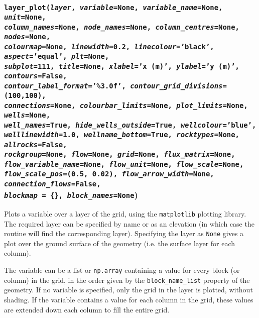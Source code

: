 \begin{snugshade}
\subsubsection{\texttt{layer\_plot(\emph{layer}, \emph{variable}=None, \emph{variable\_name}=None, \emph{unit}=None,\\
    \emph{column\_names}=None, \emph{node\_names}=None, \emph{column\_centres}=None, \emph{nodes}=None,\\
    \emph{colourmap}=None, \emph{linewidth}=0.2, \emph{linecolour}='black', \emph{aspect}='equal', \emph{plt}=None,\\
    \emph{subplot}=111, \emph{title}=None, \emph{xlabel}='x (m)', \emph{ylabel}='y (m)', \emph{contours}=False,\\
    \emph{contour\_label\_format}='\%3.0f', \emph{contour\_grid\_divisions}=(100,100),\\
    \emph{connections}=None, \emph{colourbar\_limits}=None, \emph{plot\_limits}=None, \emph{wells}=None,\\
    \emph{well\_names}=True, \emph{hide\_wells\_outside}=True, \emph{wellcolour}='blue', \\
    \emph{welllinewidth}=1.0, \emph{wellname\_bottom}=True, \emph{rocktypes}=None, \emph{allrocks}=False,\\
    \emph{rockgroup}=None, \emph{flow}=None, \emph{grid}=None, \emph{flux\_matrix}=None,\\
    \emph{flow\_variable\_name}=None, \emph{flow\_unit}=None, \emph{flow\_scale}=None,\\
    \emph{flow\_scale\_pos}=(0.5, 0.02), \emph{flow\_arrow\_width}=None, \emph{connection\_flows}=False,\\
    \emph{blockmap} = \{\}, \emph{block\_names}=None})}\end{snugshade}
\label{sec:mulgrid:layer_plot}

Plots a variable over a layer of the grid, using the \texttt{matplotlib} plotting library.  The required layer can be specified by name or as an elevation (in which case the routine will find the corresponding layer).  Specifying the layer as \texttt{None} gives a plot over the ground surface of the geometry (i.e. the surface layer for each column).

The variable can be a list or \texttt{np.array} containing a value for every block (or column) in the grid, in the order given by the \texttt{block\_name\_list} property of the geometry. If no variable is specified, only the grid in the layer is plotted, without shading.  If the variable contains a value for each column in the grid, these values are extended down each column to fill the entire grid.

